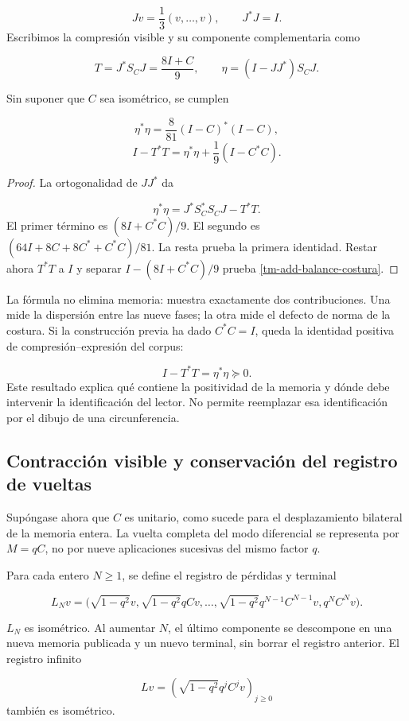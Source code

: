 \[
Jv=\frac13(v,\ldots,v),\qquad J^*J=I.
\]
Escribimos la compresión visible y su componente complementaria como

\[
T=J^*S_CJ=\frac{8I+C}{9},\qquad
\eta=(I-JJ^*)S_CJ.
\]
\begin{proposition}
\label{tm-add-proposicion-costura-1}
Sin suponer que \(C\) sea isométrico, se cumplen

\[
\eta^*\eta=\frac8{81}(I-C)^*(I-C),
\]
\begin{equation}
\boxed{I-T^*T=\eta^*\eta+\frac19(I-C^*C).}
\label{tm-add-balance-costura}
\end{equation}
\end{proposition}

\begin{proof}
La ortogonalidad de \(JJ^*\) da

\[
\eta^*\eta=J^*S_C^*S_CJ-T^*T.
\]
El primer término es \((8I+C^*C)/9\). El segundo es \((64I+8C+8C^*+C^*C)/81\). La resta prueba la primera identidad. Restar ahora \(T^*T\) a \(I\) y separar \(I-(8I+C^*C)/9\) prueba \eqref{tm-add-balance-costura}.
\end{proof}

La fórmula no elimina memoria: muestra exactamente dos contribuciones. Una mide la dispersión entre las nueve fases; la otra mide el defecto de norma de la costura. Si la construcción previa ha dado \(C^*C=I\), queda la identidad positiva de compresión–expresión del corpus:

\[
I-T^*T=\eta^*\eta\succeq0.
\]
Este resultado explica qué contiene la positividad de la memoria y dónde debe intervenir la identificación del lector. No permite reemplazar esa identificación por el dibujo de una circunferencia.


\subsection{Contracción visible y conservación del registro de vueltas}
\label{tm-add-c3}
Supóngase ahora que \(C\) es unitario, como sucede para el desplazamiento bilateral de la memoria entera. La vuelta completa del modo diferencial se representa por \(M=qC\), no por nueve aplicaciones sucesivas del mismo factor \(q\).

Para cada entero \(N\geq1\), se define el registro de pérdidas y terminal

\[
L_Nv=\bigl(\sqrt{1-q^2}v,
\sqrt{1-q^2}qCv,\ldots,
\sqrt{1-q^2}q^{N-1}C^{N-1}v, q^NC^Nv\bigr).
\]
\begin{proposition}
\label{tm-add-proposicion-costura-2}
\(L_N\) es isométrico. Al aumentar \(N\), el último componente se descompone en una nueva memoria publicada y un nuevo terminal, sin borrar el registro anterior. El registro infinito

\[
Lv=\left(\sqrt{1-q^2}q^jC^jv\right)_{j\geq0}
\]
también es isométrico.
\end{proposition}


